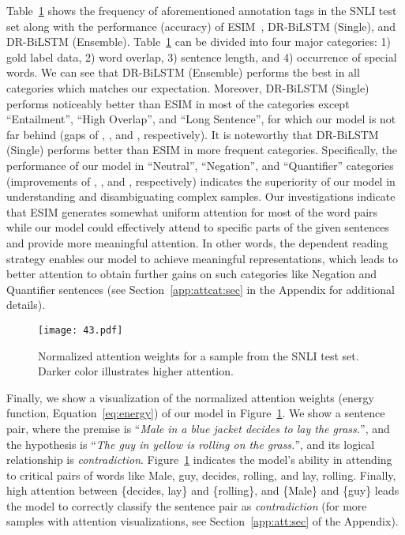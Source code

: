 \documentclass[11pt,a4paper]{article}
\begin{document}
	Table~\ref{fig:vis:att} shows the frequency of aforementioned annotation tags in the SNLI test set along with the performance (accuracy) of ESIM~\cite{him2017}, DR-BiLSTM (Single), and DR-BiLSTM (Ensemble). Table~\ref{fig:vis:att} can be divided into four major categories: 1) gold label data, 2) word overlap, 3) sentence length, and 4) occurrence of special words. We can see that DR-BiLSTM (Ensemble) performs the best in all categories which matches our expectation. Moreover, DR-BiLSTM (Single) performs noticeably better than ESIM in most of the categories except ``Entailment'', ``High Overlap'', and ``Long Sentence'', for which our model is not far behind (gaps of , , and , respectively). It is noteworthy that DR-BiLSTM (Single) performs better than ESIM in more frequent categories. Specifically, the performance of our model in ``Neutral'', ``Negation'', and ``Quantifier'' categories (improvements of , , and , respectively) indicates the superiority of our model in understanding and disambiguating complex samples. Our investigations indicate that ESIM generates somewhat uniform attention for most of the word pairs while our model could effectively attend to specific parts of the given sentences and provide more meaningful attention. In other words, the dependent reading strategy enables our model to achieve meaningful representations, which leads to better attention to obtain further gains on such categories like Negation and Quantifier sentences (see Section~\ref{app:attcat:sec} in the Appendix for additional details). 
	
	\begin{figure}[t]
		\centering
		\texttt{[image: 43.pdf]}
		\caption{Normalized attention weights for a sample from the SNLI test set. Darker color illustrates higher attention.\label{fig:vis:att}}
	\end{figure}
	
	Finally, we show a visualization of the normalized attention weights (energy function, Equation~\ref{eq:energy}) of our model in Figure~\ref{fig:vis:att}. We show a sentence pair, where the premise is ``\emph{Male in a blue jacket decides to lay the grass.}'', and the hypothesis is ``\emph{The guy in yellow is rolling on the grass.}'', and its logical relationship is \emph{contradiction}. Figure~\ref{fig:vis:att} indicates the model's ability in attending to critical pairs of words like Male, guy, decides, rolling, and lay, rolling. Finally, high attention between \{decides, lay\} and \{rolling\}, and \{Male\} and \{guy\} leads the model to correctly classify the sentence pair as \emph{contradiction} (for more samples with attention visualizations, see Section~\ref{app:att:sec} of the Appendix).
	
\end{document}
